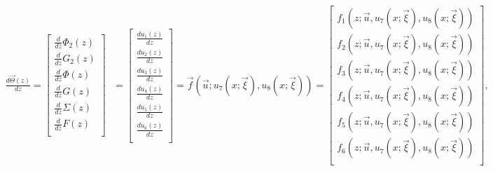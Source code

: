\documentclass[11pt]{article}
\begin{document}
\begin{equation}
	\begin{split}
		\frac{{d\vec \Theta \left( z \right)}}{{dz}} = \left[ {\begin{matrix}
			{\frac{d}{{dz}}{\Phi _2}\left( z \right)}  \\ 
			{\frac{d}{{dz}}{G_2}\left( z \right)}  \\ 
			{\frac{d}{{dz}}\Phi \left( z \right)}  \\ 
			{\frac{d}{{dz}}G\left( z \right)}  \\ 
			{\frac{d}{{dz}}\Sigma \left( z \right)}  \\ 
			{\frac{d}{{dz}}F\left( z \right)}  \\ 
			\end{matrix} } \right]{\text{ }} = \left[ {\begin{matrix}
			{\frac{{d{u_1}\left( z \right)}}{{dz}}}  \\ 
			{\frac{{d{u_2}\left( z \right)}}{{dz}}}  \\ 
			{\frac{{d{u_3}\left( z \right)}}{{dz}}}  \\ 
			{\frac{{d{u_4}\left( z \right)}}{{dz}}}  \\ 
			{\frac{{d{u_5}\left( z \right)}}{{dz}}}  \\ 
			{\frac{{d{u_6}\left( z \right)}}{{dz}}}  \\ 
			\end{matrix} } \right] = \vec f\left( {\vec u;{u_7}\left( {x;\vec \xi } \right),{u_8}\left( {x;\vec \xi } \right)} \right) = \left[ {\begin{matrix}
			{{f_1}\left( {z;\vec u,{u_7}\left( {x;\vec \xi } \right),{u_8}\left( {x;\vec \xi } \right)} \right)}  \\ 
			{{f_2}\left( {z;\vec u,{u_7}\left( {x;\vec \xi } \right),{u_8}\left( {x;\vec \xi } \right)} \right)}  \\ 
			{{f_3}\left( {z;\vec u,{u_7}\left( {x;\vec \xi } \right),{u_8}\left( {x;\vec \xi } \right)} \right)}  \\ 
			{{f_4}\left( {z;\vec u,{u_7}\left( {x;\vec \xi } \right),{u_8}\left( {x;\vec \xi } \right)} \right)}  \\ 
			{{f_5}\left( {z;\vec u,{u_7}\left( {x;\vec \xi } \right),{u_8}\left( {x;\vec \xi } \right)} \right)}  \\ 
			{{f_6}\left( {z;\vec u,{u_7}\left( {x;\vec \xi } \right),{u_8}\left( {x;\vec \xi } \right)} \right)}  \\ 
			\end{matrix} } \right],
	\end{split}
\end{equation}
\end{document}
